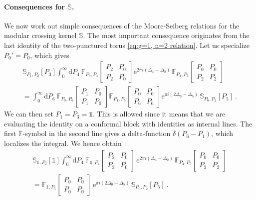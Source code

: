 \documentclass[12pt,a4paper]{article}
\renewcommand\d{\text{d}}
\newcommand\id{\mathds{1}}
\begin{document}
\paragraph{Consequences for $\mathbb{S}$.} We now work out simple consequences of the Moore-Seiberg relations for the modular crossing kernel $\mathbb{S}$. The most important consequence originates from the last identity of the two-punctured torus \eqref{eq:g=1, n=2 relation}. Let us specialize $P_0'=P_0$, which gives
\begin{multline}
            \mathbb{S}_{P_1,P_2}[P_3] \int_0^\infty\!\!\d P_4 \ \mathbb{F}_{P_3,P_4}\!\begin{bmatrix}
                P_2 & P_0 \\
                P_2 & P_0
            \end{bmatrix}
            \mathrm{e}^{2\pi i  (\Delta_4-\Delta_2)}\, 
        \mathbb{F}_{P_4,P_5}\!\begin{bmatrix}
                P_0 & P_0 \\
                P_2 & P_2
            \end{bmatrix} \\
        =
        \int_0^\infty\!\! \d P_6 \ \mathbb{F}_{P_3,P_6}\!\begin{bmatrix}
            P_1 & P_0 \\
            P_1 & P_0
        \end{bmatrix}
        \mathbb{F}_{P_1,P_5}\!\begin{bmatrix}
            P_0 & P_0 \\
            P_6 & P_6
        \end{bmatrix} \mathrm{e}^{\pi i (2\Delta_0-\Delta_5)} \, \mathbb{S}_{P_6,P_2}[P_5]\ .
\end{multline}
We can then set $P_1=P_3=\id$. This is allowed since it means that we are evaluating the identity on a conformal block with identities as internal lines. The first $\mathbb{F}$-symbol in the second line gives a delta-function $\delta(P_6-P_1)$, which localizes the integral. We hence obtain
\begin{multline} 
\mathbb{S}_{\id,P_2}[\id]\int_0^\infty\!\! \d P_4 \ \mathbb{F}_{\id,P_4}\!\begin{bmatrix}
    P_2 & P_0 \\
    P_2 & P_0
\end{bmatrix}\, \mathrm{e}^{2\pi i(\Delta_4-\Delta_2)} \, \mathbb{F}_{P_4,P_5} \!\begin{bmatrix}
    P_0 & P_0 \\
    P_2 & P_2
\end{bmatrix}\\
=\mathbb{F}_{\id,P_5} \!\begin{bmatrix}
    P_0 & P_0 \\ P_0 & P_0
\end{bmatrix} \, \mathrm{e}^{\pi i(2 \Delta_0-\Delta_5)} \, \mathbb{S}_{P_0,P_2}[P_5]\ .
\end{multline}
\end{document}
